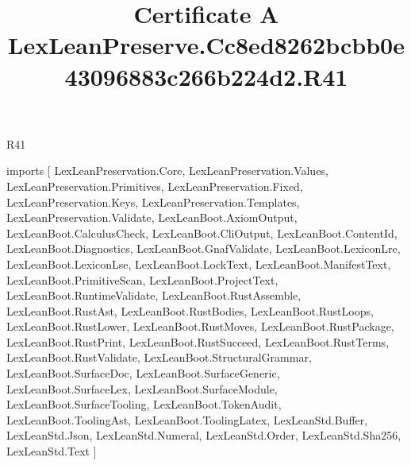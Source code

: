 \begin{lexlean}{R41}
\title{Certificate A LexLeanPreserve.Cc8ed8262bcbb0e43096883c266b224d2.R41}
\begin{coremodule}
imports [
  LexLeanPreservation.Core,
  LexLeanPreservation.Values,
  LexLeanPreservation.Primitives,
  LexLeanPreservation.Fixed,
  LexLeanPreservation.Keys,
  LexLeanPreservation.Templates,
  LexLeanPreservation.Validate,
  LexLeanBoot.AxiomOutput,
  LexLeanBoot.CalculusCheck,
  LexLeanBoot.CliOutput,
  LexLeanBoot.ContentId,
  LexLeanBoot.Diagnostics,
  LexLeanBoot.GnafValidate,
  LexLeanBoot.LexiconLre,
  LexLeanBoot.LexiconLse,
  LexLeanBoot.LockText,
  LexLeanBoot.ManifestText,
  LexLeanBoot.PrimitiveScan,
  LexLeanBoot.ProjectText,
  LexLeanBoot.RuntimeValidate,
  LexLeanBoot.RustAssemble,
  LexLeanBoot.RustAst,
  LexLeanBoot.RustBodies,
  LexLeanBoot.RustLoops,
  LexLeanBoot.RustLower,
  LexLeanBoot.RustMoves,
  LexLeanBoot.RustPackage,
  LexLeanBoot.RustPrint,
  LexLeanBoot.RustSucceed,
  LexLeanBoot.RustTerms,
  LexLeanBoot.RustValidate,
  LexLeanBoot.StructuralGrammar,
  LexLeanBoot.SurfaceDoc,
  LexLeanBoot.SurfaceGeneric,
  LexLeanBoot.SurfaceLex,
  LexLeanBoot.SurfaceModule,
  LexLeanBoot.SurfaceTooling,
  LexLeanBoot.TokenAudit,
  LexLeanBoot.ToolingAst,
  LexLeanBoot.ToolingLatex,
  LexLeanStd.Buffer,
  LexLeanStd.Json,
  LexLeanStd.Numeral,
  LexLeanStd.Order,
  LexLeanStd.Sha256,
  LexLeanStd.Text
]


\end{coremodule}
\end{lexlean}

